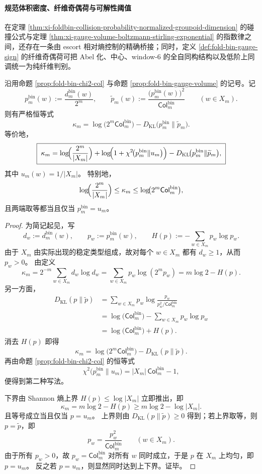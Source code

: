 \paragraph{规范体积密度、纤维奇偶荷与可解性阈值}
在定理 \ref{thm:xi-foldbin-collision-probability-normalized-groupoid-dimension} 的碰撞公式与定理 \ref{thm:xi-gauge-volume-boltzmann-stirling-exponential} 的指数律之间，还存在一条由 escort 相对熵控制的精确桥接；同时，定义 \ref{def:fold-bin-gauge-sign} 的纤维奇偶荷可把 Abel 化、中心、window-\(6\) 的全自同构结构以及低阶上同调统一为纯纤维判别。

\begin{theorem}\label{thm:xi-foldbin-gauge-escort-kl-decomposition}
沿用命题 \ref{prop:fold-bin-chi2-col} 与命题 \ref{prop:fold-bin-gauge-volume} 的记号。记
\[
p_m^{\mathrm{bin}}(w):=\frac{d_m^{\mathrm{bin}}(w)}{2^m},
\qquad
\widetilde p_m(w):=\frac{\bigl(p_m^{\mathrm{bin}}(w)\bigr)^2}{\mathsf{Col}^{\mathrm{bin}}_m}
\qquad (w\in X_m).
\]
则有严格恒等式
\[
\boxed{\;
\kappa_m
=
\log\!\bigl(2^m\mathsf{Col}^{\mathrm{bin}}_m\bigr)
-D_{\mathrm{KL}}\!\bigl(p_m^{\mathrm{bin}}\|\widetilde p_m\bigr).
\;}
\]
等价地，
\[
\boxed{\;
\kappa_m
=
\log\!\Bigl(\frac{2^m}{|X_m|}\Bigr)
+\log\!\Bigl(1+\chi^2\!\bigl(p_m^{\mathrm{bin}}\|u_m\bigr)\Bigr)
-D_{\mathrm{KL}}\!\bigl(p_m^{\mathrm{bin}}\|\widetilde p_m\bigr),
\;}
\]
其中 \(u_m(w)=1/|X_m|\)。
特别地，
\[
\log\!\Bigl(\frac{2^m}{|X_m|}\Bigr)
\le
\kappa_m
\le
\log\!\bigl(2^m\mathsf{Col}^{\mathrm{bin}}_m\bigr),
\]
且两端取等都当且仅当 \(p_m^{\mathrm{bin}}=u_m\)。
\end{theorem}
\begin{proof}
为简记起见，写
\[
d_w:=d_m^{\mathrm{bin}}(w),
\qquad
p_w:=p_m^{\mathrm{bin}}(w),
\qquad
H(p):=-\sum_{w\in X_m}p_w\log p_w.
\]
由于 \(X_m\) 由实际出现的稳定类型组成，故对每个 \(w\in X_m\) 都有 \(d_w\ge 1\)，从而 \(p_w>0\)。
由定义
\[
\kappa_m
=
2^{-m}\sum_{w\in X_m}d_w\log d_w
=
\sum_{w\in X_m}p_w\log(2^m p_w)
=
m\log 2-H(p).
\]
另一方面，
\[
\begin{aligned}
D_{\mathrm{KL}}(p\|\widetilde p)
&=
\sum_{w\in X_m}p_w\log\frac{p_w}{p_w^2/\mathsf{Col}^{\mathrm{bin}}_m}\\
&=
\log\!\bigl(\mathsf{Col}^{\mathrm{bin}}_m\bigr)-\sum_{w\in X_m}p_w\log p_w\\
&=
\log\!\bigl(\mathsf{Col}^{\mathrm{bin}}_m\bigr)+H(p).
\end{aligned}
\]
消去 \(H(p)\) 即得
\[
\kappa_m
=
\log\!\bigl(2^m\mathsf{Col}^{\mathrm{bin}}_m\bigr)
-D_{\mathrm{KL}}(p\|\widetilde p).
\]
再由命题 \ref{prop:fold-bin-chi2-col} 的恒等式
\[
\chi^2\!\bigl(p_m^{\mathrm{bin}}\|u_m\bigr)
=
|X_m|\,\mathsf{Col}^{\mathrm{bin}}_m-1,
\]
便得到第二种写法。

下界由 Shannon 熵上界 \(H(p)\le \log|X_m|\) 立即推出，即
\[
\kappa_m=m\log 2-H(p)\ge m\log 2-\log|X_m|.
\]
且等号成立当且仅当 \(p=u_m\)。
上界则由 \(D_{\mathrm{KL}}(p\|\widetilde p)\ge 0\) 得到；若上界取等，则 \(p=\widetilde p\)，即
\[
p_w=\frac{p_w^2}{\mathsf{Col}^{\mathrm{bin}}_m}
\qquad (w\in X_m).
\]
由于所有 \(p_w>0\)，故 \(p_w=\mathsf{Col}^{\mathrm{bin}}_m\) 对所有 \(w\) 同时成立，于是 \(p\) 在 \(X_m\) 上均匀，即 \(p=u_m\)。
反之若 \(p=u_m\)，则显然同时达到上下界。证毕。
\end{proof}

